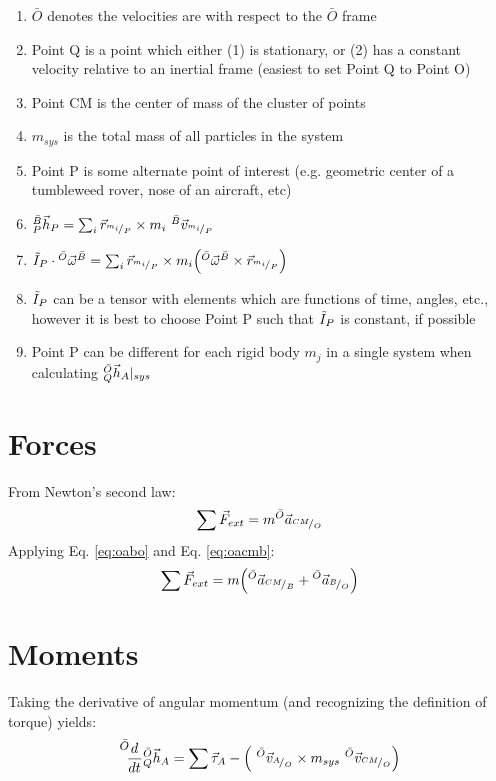 \documentclass{article}
\begin{document}
\begin{enumerate}
    \item $\bar{O}$ denotes the velocities are with respect to the $\bar{O}$ frame
    \item Point Q is a point which either (1) is stationary, or (2) has a constant velocity relative to an inertial frame (easiest to set Point Q to Point O)
    \item Point CM is the center of mass of the cluster of points
    \item $m_{sys}$ is the total mass of all particles in the system
    \item Point P is some alternate point of interest (e.g. geometric center of a tumbleweed rover, nose of an aircraft, etc)
    \item $\AngMom{B}{P}{P} = \sum_{i} \Cross{\PosVec{m_i}{P}}{m_i\VelVec{B}{m_i}{P}}$
    \item $\Inert{P}\cdot\AngVel{O}{B} = \sum_{i} \Cross{\PosVec{m_i}{P}}{m_i\Big(\Cross{\AngVel{O}{B}}{\PosVec{m_i}{P}}}\Big)$
    \item $\Inert{P}$ can be a tensor with elements which are functions of time, angles, etc., however it is best to choose Point P such that $\Inert{P}$ is constant, if possible
    \item Point P can be different for each rigid body $m_j$ in a single system when calculating $\AngMom{O}{Q}{A}\vert_{sys}$
\end{enumerate}



\section{Forces}
From Newton's second law:
\begin{equation}
    \Fext = m\AcclVec{O}{CM}{O}
    \label{eq:newton2}
\end{equation}
Applying Eq. \ref{eq:oabo} and Eq. \ref{eq:oacmb}:
\begin{equation}
    \Fext = m\Big( \AcclVec{O}{CM}{B} + \AcclVec{O}{B}{O} \Big)
    \label{eq:feqma}
\end{equation}



\section{Moments}
Taking the derivative of angular momentum (and recognizing the definition of torque) yields:
\begin{equation}
    \FrameDeriv{O}{t}{\AngMom{O}{Q}{A}} = \Text[A] - \Big( \Cross{\VelVec{O}{A}{O}}{m_{sys}\VelVec{O}{CM}{O}} \Big)
    \label{eq:sumtorq}
\end{equation}
\end{document}
